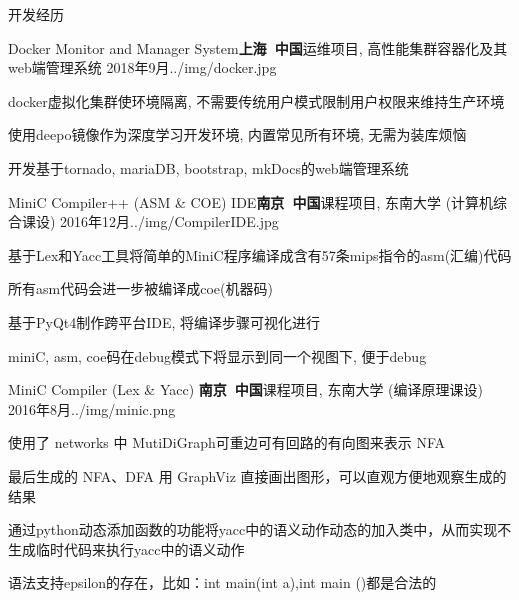 \documentclass{resume_ch} %
\begin{document}
\begin{rSection}{开发经历}

\begin{rSubsection}{Docker Monitor and Manager System}{\bf 上海\ 中国}{运维项目, 高性能集群容器化及其web端管理系统 \href{https://github.com/piaozhx/DockerMonitor}{{\color{blue}{[Github]}}}    }{2018年9月}{../img/docker.jpg}
    \item docker虚拟化集群使环境隔离, 不需要传统用户模式限制用户权限来维持生产环境
    \item 使用deepo镜像作为深度学习开发环境, 内置常见所有环境, 无需为装库烦恼
    \item 开发基于tornado, mariaDB, bootstrap, mkDocs的web端管理系统
\end{rSubsection}

\begin{rSubsection}{MiniC Compiler++ (ASM \& COE) IDE}{\bf 南京\ 中国}{课程项目, 东南大学 (计算机综合课设)   \href{https://github.com/piaozhx/CompilerIDE}{{\color{blue}{[Github]}}}     }{2016年12月}{../img/CompilerIDE.jpg}
    \item 基于Lex和Yacc工具将简单的MiniC程序编译成含有57条mips指令的asm(汇编)代码
    \item 所有asm代码会进一步被编译成coe(机器码)
    \item 基于PyQt4制作跨平台IDE, 将编译步骤可视化进行
    \item miniC, asm, coe码在debug模式下将显示到同一个视图下, 便于debug
\end{rSubsection}


\begin{rSubsection}{MiniC Compiler (Lex \& Yacc) }{\bf 南京\ 中国}{课程项目, 东南大学 (编译原理课设)  \href{https://github.com/seucs/compiler}{{\color{blue}{[Github]}}}    }{2016年8月}{../img/minic.png}
    \item 使用了 networks 中 MutiDiGraph可重边可有回路的有向图来表示 NFA
    \item 最后生成的 NFA、DFA 用 GraphViz 直接画出图形，可以直观方便地观察生成的结果
    \item 通过python动态添加函数的功能将yacc中的语义动作动态的加入类中，从而实现不生成临时代码来执行yacc中的语义动作
    \item 语法支持epsilon的存在，比如：int main(int a),int main ()都是合法的
\end{rSubsection}


\end{rSection}
\end{document}
